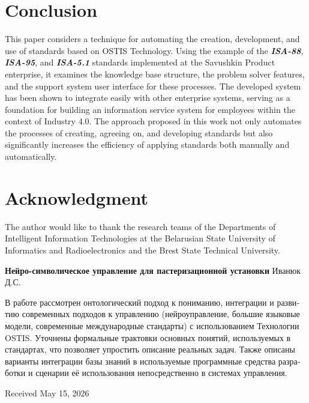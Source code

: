 \section{Conclusion}

This paper considers a technique for automating the creation, development, and
use of standards based on OSTIS Technology. Using the example of the
\textit{\textbf{ISA-88}}, \textit{\textbf{ISA-95}}, and
\textit{\textbf{ISA-5.1}} standards implemented at the Savushkin Product
enterprise, it examines the knowledge base structure, the problem solver
features, and the support system user interface for these processes. The
developed system has been shown to integrate easily with other enterprise
systems, serving as a foundation for building an information service system for
employees within the context of Industry 4.0. The approach proposed in this work
not only automates the processes of creating, agreeing on, and developing
standards but also significantly increases the efficiency of applying standards
both manually and automatically.

\section*{Acknowledgment}

The author would like to thank the research teams of the Departments of
Intelligent Information Technologies at the Belarusian State University of
Informatics and Radioelectronics and the Brest State Technical University.


\balance


\bigskip
\begin{otherlanguage}{russian}
  \begin{center}
    \large\textbf{Нейро-символическое управление для пастеризационной установки}
    \medskip
    Иванюк Д.С.
  \end{center}

  \small
  В работе рассмотрен онтологический подход к пониманию, интеграции и развитию
  современных подходов к управлению (нейроуправление, большие языковые модели,
  современные международные стандарты) с использованием Технологии OSTIS.
  Уточнены формальные трактовки основных понятий, используемых в стандартах, что
  позволяет упростить описание реальных задач. Также описаны варианты интеграции
  базы знаний в используемые программные средства разработки и сценарии её
  использования непосредственно в системах управления.

\end{otherlanguage}

\medskip
\normalsize
\hfill Received May 15, 2026

